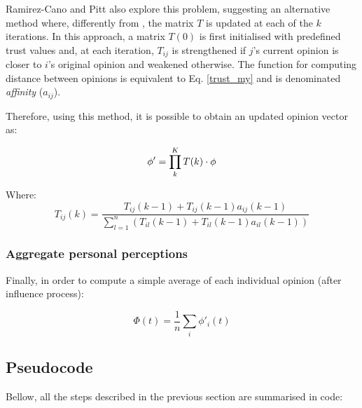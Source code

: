 \documentclass[conference,compsoc]{IEEEtran}
\begin{document}
Ramirez-Cano and Pitt \cite{Ramirez-Cano2006} also explore this problem, suggesting an alternative method where, differently from \cite{degott}, the matrix $T$ is updated at each of the $k$ iterations. In this approach, a matrix $T(0)$ is first initialised with predefined trust values and, at each iteration, $T_{ij}$ is strengthened if $j$'s current opinion is closer to $i$'s original opinion and weakened otherwise. The function for computing distance between opinions is equivalent to Eq. \ref{trust_my} and is denominated \emph{affinity} ($a_{ij}$).

Therefore, using this method, it is possible to obtain an updated opinion vector as:

\begin{equation}
    \phi' = \prod_k^K T(k) \cdot \phi \\
\end{equation}

Where:
$$
T_{ij}(k) = \frac{T_{ij}(k-1) + T_{ij}(k-1) a_{ij}(k-1)}{\sum_{l=1}^n \left ( T_{il}(k-1) + T_{il}(k-1) a_{il}(k-1) \right ) }
$$





\subsubsection*{Aggregate personal perceptions}

Finally, in order to compute a simple average of each individual opinion (after influence process):

$$\Phi(t) = \frac{1}{n}\sum_i \phi'_i(t)$$

\subsection{Pseudocode}

Bellow, all the steps described in the previous section are summarised in code:
\end{document}

